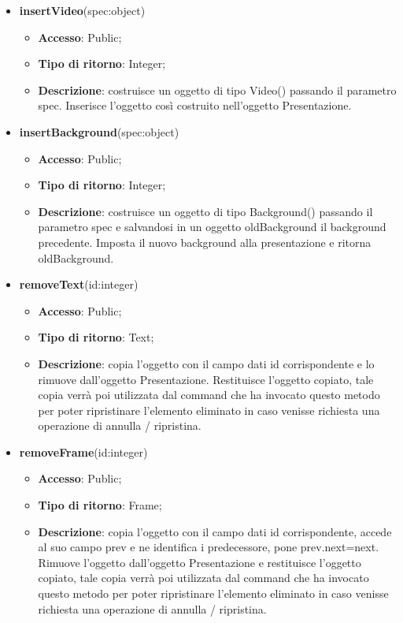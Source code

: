 {\begin{itemize}
			\item \textbf{insertVideo}(spec:object)
			\begin{itemize}
				\item \textbf{Accesso}: Public;
				\item \textbf{Tipo di ritorno}: Integer;
				\item \textbf{Descrizione}: costruisce un oggetto di tipo Video() passando il parametro spec. Inserisce l’oggetto così costruito nell’oggetto Presentazione.
			\end{itemize}
			\item \textbf{insertBackground}(spec:object)
			\begin{itemize}
				\item \textbf{Accesso}: Public;
				\item \textbf{Tipo di ritorno}: Integer;
				\item \textbf{Descrizione}: costruisce un oggetto di tipo Background() passando il parametro spec e salvandosi in un oggetto oldBackground il background precedente. Imposta il nuovo background alla presentazione e ritorna oldBackground.
			\end{itemize}
			\item \textbf{removeText}(id:integer)
			\begin{itemize}
				\item \textbf{Accesso}: Public;
				\item \textbf{Tipo di ritorno}: Text;
				\item \textbf{Descrizione}: copia l’oggetto con il campo dati id corrispondente e lo rimuove dall’oggetto Presentazione. Restituisce l’oggetto copiato, tale copia verrà poi utilizzata dal command che ha invocato questo metodo per poter ripristinare l'elemento eliminato in caso venisse richiesta una operazione di annulla / ripristina.
			\end{itemize}
			\item \textbf{removeFrame}(id:integer)
			\begin{itemize}
				\item \textbf{Accesso}: Public;
				\item \textbf{Tipo di ritorno}: Frame;
				\item \textbf{Descrizione}: copia l’oggetto con il campo dati id corrispondente, accede al suo campo prev e ne identifica i predecessore, pone prev.next=next. Rimuove l’oggetto dall’oggetto Presentazione e restituisce l’oggetto copiato, tale copia verrà poi utilizzata dal command che ha invocato questo metodo per poter ripristinare l'elemento eliminato in caso venisse richiesta una operazione di annulla / ripristina.

\end{itemize}
\end{itemize}}
